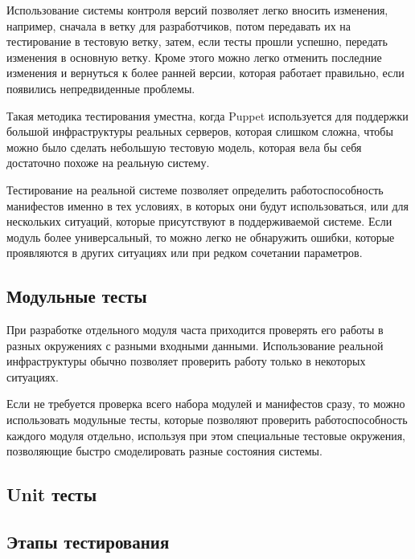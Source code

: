 Использование системы контроля версий позволяет легко вносить изменения, например, сначала в ветку для разработчиков, потом передавать их на тестирование в тестовую ветку, затем, если тесты прошли успешно, передать изменения в основную ветку. Кроме этого можно легко отменить последние изменения и вернуться к более ранней версии, которая работает правильно, если появились непредвиденные проблемы.

Такая методика тестирования уместна, когда Puppet используется для поддержки большой инфраструктуры реальных серверов, которая слишком сложна, чтобы можно было сделать небольшую тестовую модель, которая вела бы себя достаточно похоже на реальную систему.

Тестирование на реальной системе позволяет определить работоспособность манифестов именно в тех условиях, в которых они будут использоваться, или для нескольких ситуаций, которые присутствуют в поддерживаемой системе. Если модуль более универсальный, то можно легко не обнаружить ошибки, которые проявляются в других ситуациях или при редком сочетании параметров.

\subsection{Модульные тесты}

При разработке отдельного модуля часта приходится проверять его работы в разных окружениях с разными входными данными. Использование реальной инфраструктуры обычно позволяет проверить работу только в некоторых ситуациях.

Если не требуется проверка всего набора модулей и манифестов сразу, то можно использовать модульные тесты, которые позволяют проверить работоспособность каждого модуля отдельно, используя при этом специальные тестовые окружения, позволяющие быстро смоделировать разные состояния системы.



\subsection{Unit тесты}

\subsection{Этапы тестирования}